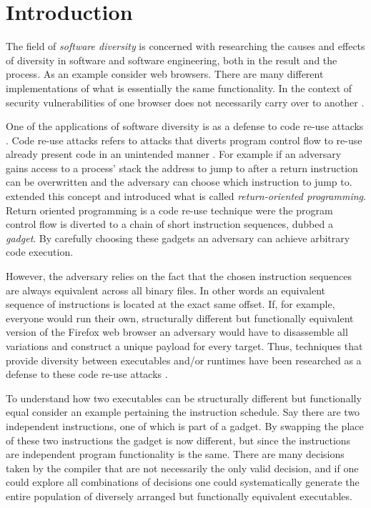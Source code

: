 \chapter{Introduction}

The field of \textit{software diversity} is concerned with researching the
causes and effects of diversity in software and software engineering, both in the result
and the process. As an example consider web browsers. There are many different implementations
of what is essentially the same functionality. In the context of security vulnerabilities
of one browser does not necessarily carry over to another \cite{survey}.

One of the applications of software diversity is as a defense to code re-use attacks \cite{survey}.
Code re-use attacks refers to attacks that diverts program control flow to re-use already
present code in an unintended manner \cite{code-re-use}. For example if an adversary gains
access to a process' stack the address to jump to after a return instruction can be
overwritten and the adversary can choose which instruction to jump to. \textcite{rop}
extended this concept and introduced what is called \textit{return-oriented programming}.
Return oriented programming is a code re-use technique were the program control flow is
diverted to a chain of short instruction sequences, dubbed a \textit{gadget}. By carefully
choosing these gadgets an adversary can achieve arbitrary code execution.

However, the adversary relies on the fact that the chosen instruction sequences are always
equivalent across all binary files. In other words an equivalent sequence of instructions
is located at the exact same offset. If, for example, everyone would run their own,
structurally different but functionally equivalent version of the Firefox web browser an
adversary would have to disassemble all variations and construct a unique payload for
every target. Thus, techniques that provide diversity between executables and/or runtimes
have been researched as a defense to these code re-use attacks \cite{survey}.

To understand how two executables can be structurally different but functionally equal
consider an example pertaining the instruction schedule. Say there are two independent
instructions, one of which is part of a gadget. By swapping the place of these two
instructions the gadget is now different, but since the instructions are independent
program functionality is the same. There are many decisions taken by the compiler that are
not necessarily the only valid decision, and if one could explore all combinations of
decisions one could systematically generate the entire population of diversely arranged
but functionally equivalent executables.


